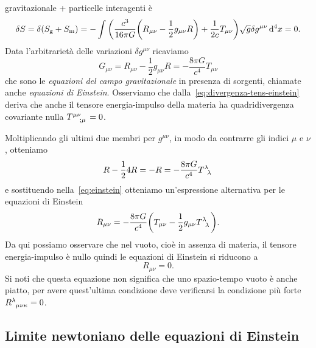 gravitazionale + particelle interagenti è
\begin{equation}
  \delta S = \delta(S_{\textup{g}} + S_{\textup{m}}) = -\int \bigg(
  \frac{c^{3}}{16\pi G} \bigg( R_{\mu\nu} - \frac{1}{2} g_{\mu\nu} R \bigg) +
  \frac{1}{2c} T_{\mu\nu} \bigg) \sqrt{g} \delta g^{\mu\nu} \mathop{}\!\mathrm{d}^{4} x = 0.
\end{equation}
Data l'arbitrarietà delle variazioni $\delta g^{\mu\nu}$ ricaviamo
\begin{equation}
  \label{eq:einstein}
  G_{\mu\nu} = R_{\mu\nu} - \frac{1}{2} g_{\mu\nu} R = -\frac{8\pi G}{c^{4}}
  T_{\mu\nu}
\end{equation}
che sono le \emph{equazioni del campo gravitazionale} in presenza di sorgenti,
chiamate anche \emph{equazioni di Einstein}.
Osserviamo che dalla~\eqref{eq:divergenza-tens-einstein} deriva che anche il
tensore energia-impulso della materia ha quadridivergenza covariante nulla
$\tensor{T}{^{\mu\nu}_{;\mu}} = 0$.

Moltiplicando gli ultimi due membri per $g^{\mu\nu}$, in modo da contrarre gli
indici $\mu$ e $\nu$, otteniamo
\begin{equation}
  R - \frac{1}{2}4R = -R = -\frac{8\pi G}{c^{4}}\tensor{T}{^{\lambda}_{\lambda}}
\end{equation}
e sostituendo nella~\eqref{eq:einstein} otteniamo un'espressione alternativa per
le equazioni di Einstein
\begin{equation}
  R_{\mu\nu} = -\frac{8\pi G}{c^{4}} \bigg( T_{\mu\nu} -
  \frac{1}{2}g_{\mu\nu}\tensor{T}{^{\lambda}_{\lambda}} \bigg).
\end{equation}
Da qui possiamo osservare che nel vuoto, cioè in assenza di materia, il tensore
energia-impulso è nullo quindi le equazioni di
Einstein si riducono a
\begin{equation}
  R_{\mu\nu} = 0.
\end{equation}
Si noti che questa equazione non significa che uno spazio-tempo vuoto è anche
piatto, per avere quest'ultima condizione deve verificarsi la condizione più
forte $\tensor{R}{^{\lambda}_{\mu\nu\kappa}} = 0$.

\subsection{Limite newtoniano delle equazioni di Einstein}
\label{sec:limite-newtoniano-einstein}


